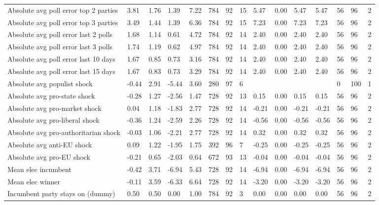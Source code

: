 \begin{longtable}{lllllllllllllll}
Absolute avg poll error top 2 parties & 3.81 & 1.76 & 1.39 & 7.22 & 784 & 92 & 15 & 5.47 & 0.00 & 5.47 & 5.47 & 56 & 96 & 2\\
Absolute avg poll error top 3 parties & 3.49 & 1.44 & 1.39 & 6.36 & 784 & 92 & 15 & 7.23 & 0.00 & 7.23 & 7.23 & 56 & 96 & 2\\
Absolute avg poll error last 2 polls & 1.68 & 1.14 & 0.61 & 4.72 & 784 & 92 & 14 & 2.40 & 0.00 & 2.40 & 2.40 & 56 & 96 & 2\\
\addlinespace
Absolute avg poll error last 3 polls & 1.74 & 1.19 & 0.62 & 4.97 & 784 & 92 & 14 & 2.40 & 0.00 & 2.40 & 2.40 & 56 & 96 & 2\\
Absolute avg poll error last 10 days & 1.67 & 0.85 & 0.73 & 3.16 & 784 & 92 & 14 & 2.40 & 0.00 & 2.40 & 2.40 & 56 & 96 & 2\\
Absolute avg poll error last 15 days & 1.67 & 0.83 & 0.73 & 3.29 & 784 & 92 & 14 & 2.40 & 0.00 & 2.40 & 2.40 & 56 & 96 & 2\\
Absolute avg populist shock & -0.44 & 2.91 & -5.44 & 3.60 & 280 & 97 & 6 &  &  &  &  & 0 & 100 & 1\\
Absolute avg pro-state shock & -0.28 & 1.27 & -2.56 & 1.47 & 728 & 92 & 13 & 0.15 & 0.00 & 0.15 & 0.15 & 56 & 96 & 2\\
\addlinespace
Absolute avg pro-market shock & 0.04 & 1.18 & -1.83 & 2.77 & 728 & 92 & 14 & -0.21 & 0.00 & -0.21 & -0.21 & 56 & 96 & 2\\
Absolute avg pro-liberal shock & -0.36 & 1.24 & -2.59 & 2.26 & 728 & 92 & 14 & -0.56 & 0.00 & -0.56 & -0.56 & 56 & 96 & 2\\
Absolute avg pro-authoritarian shock & -0.03 & 1.06 & -2.21 & 2.77 & 728 & 92 & 14 & 0.32 & 0.00 & 0.32 & 0.32 & 56 & 96 & 2\\
Absolute avg anti-EU shock & 0.09 & 1.22 & -1.95 & 1.75 & 392 & 96 & 7 & -0.25 & 0.00 & -0.25 & -0.25 & 56 & 96 & 2\\
Absolute avg pro-EU shock & -0.21 & 0.65 & -2.03 & 0.64 & 672 & 93 & 13 & -0.04 & 0.00 & -0.04 & -0.04 & 56 & 96 & 2\\
\addlinespace
Mean elec incumbent & -0.42 & 3.71 & -6.94 & 5.43 & 728 & 92 & 14 & -6.94 & 0.00 & -6.94 & -6.94 & 56 & 96 & 2\\
Mean elec winner & -0.11 & 3.59 & -6.33 & 6.64 & 728 & 92 & 14 & -3.20 & 0.00 & -3.20 & -3.20 & 56 & 96 & 2\\
Incumbent party stays on (dummy) & 0.50 & 0.50 & 0.00 & 1.00 & 784 & 92 & 3 & 0.00 & 0.00 & 0.00 & 0.00 & 56 & 96 & 2\\

\end{longtable}
